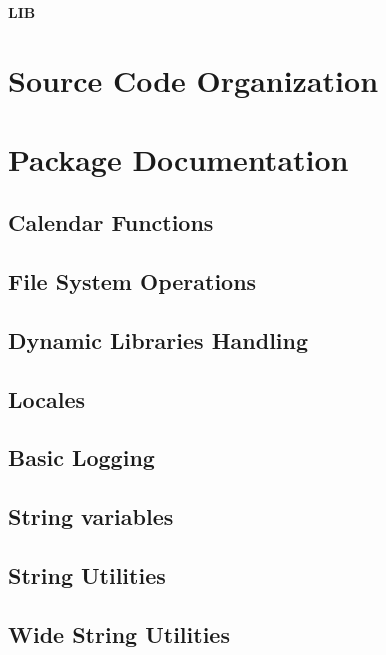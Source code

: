 \documentclass[english,letterpaper]{book}
\begin{document}
\subsubsection{LIB}

\chapter{Source Code Organization}
\label{source_organization}

\chapter{Package Documentation}
\label{api}

\section{Calendar Functions}
\label{api:calendar}


\section{File System Operations}
\label{api:file_system}

\section{Dynamic Libraries Handling}
\label{api:libraries}

\section{Locales}
\label{api:locales}


\section{Basic Logging}
\label{api:log}

\section{String variables}
\label{api:replacer}

\section{String Utilities}
\label{api:string_util}

\section{Wide String Utilities}
\label{api:wide_string_util}
\end{document}
